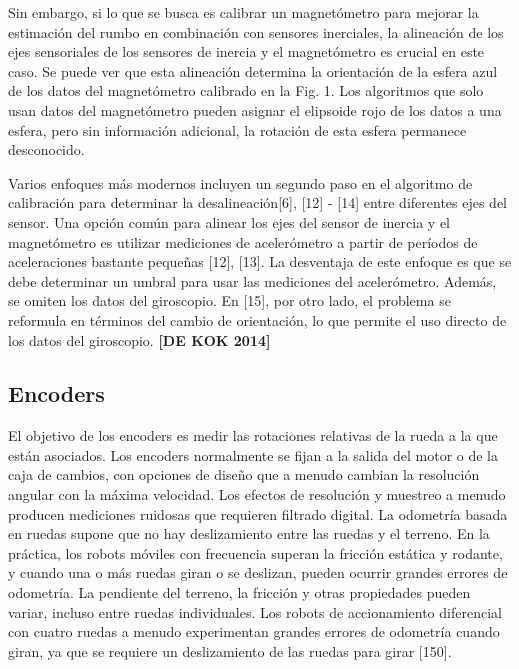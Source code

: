 Sin embargo, si lo que se busca es calibrar un magnetómetro para mejorar la estimación del rumbo en combinación con sensores inerciales, la alineación de los ejes sensoriales de los sensores de inercia y el magnetómetro es crucial en este caso. Se puede ver que esta alineación determina la orientación de la esfera azul de los datos del magnetómetro calibrado en la Fig. 1. Los algoritmos que solo usan datos del magnetómetro pueden asignar el elipsoide rojo de los datos a una esfera, pero sin información adicional, la rotación de esta esfera permanece desconocido.

Varios enfoques más modernos incluyen un segundo paso en el algoritmo de calibración para determinar la desalineación[6], [12] - [14] entre diferentes ejes del sensor. Una opción común para alinear los ejes del sensor de inercia y el magnetómetro es utilizar mediciones de acelerómetro a partir de períodos de aceleraciones bastante pequeñas [12], [13]. La desventaja de este enfoque es que se debe determinar un umbral para usar las mediciones del acelerómetro. Además, se omiten los datos del giroscopio. En [15], por otro lado, el problema se reformula en términos del cambio de orientación, lo que permite el uso directo de los datos del giroscopio. \textbf{[DE KOK 2014]}


\subsection{Encoders}
El objetivo de los encoders es medir las rotaciones relativas de la rueda a la que están asociados. Los encoders normalmente se fijan a la salida del motor o de la caja de cambios, con opciones de diseño que a menudo cambian la resolución angular con la máxima velocidad. Los efectos de resolución y muestreo a menudo producen mediciones ruidosas que requieren filtrado digital. La odometría basada en ruedas supone que no hay deslizamiento entre las ruedas y el terreno. En la práctica, los robots móviles con frecuencia superan la fricción estática y rodante, y cuando una o más ruedas giran o se deslizan, pueden ocurrir grandes errores de odometría. La pendiente del terreno, la fricción y otras propiedades pueden variar, incluso entre ruedas individuales. Los robots de accionamiento diferencial con cuatro ruedas a menudo experimentan grandes errores de odometría cuando giran, ya que se requiere un deslizamiento de las ruedas para girar [150].

